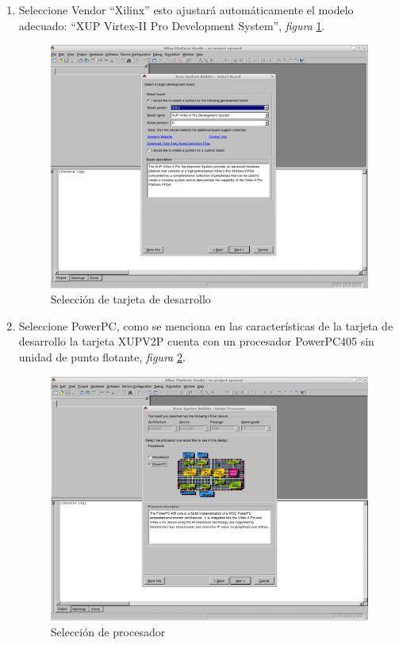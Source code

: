 \begin{enumerate}
  
 \item Seleccione Vendor ``Xilinx'' esto ajustará automáticamente el modelo
 adecuado: ``XUP Virtex-II Pro Development System'', \emph{figura}
\ref{Selección de tarjeta de desarrollo}.
  \begin{figure}[h!] 
  \centering
  \includegraphics[scale=.25]{./figuras/EDK3.png}
  \caption{Selección de tarjeta de desarrollo}
  \label{Selección de tarjeta de desarrollo}
  \end{figure}
    
  \item Seleccione PowerPC, como se menciona en las características de la
tarjeta de desarrollo la tarjeta XUPV2P cuenta con un procesador PowerPC405 sin
unidad de punto flotante, \emph{figura}
\ref{Selección de procesador}.
  \begin{figure}[h!] 
  \centering
  \includegraphics[scale=.25]{./figuras/EDK4.png}
  \caption{Selección de procesador}
  \label{Selección de procesador}
  \end{figure}
 

\end{enumerate}
